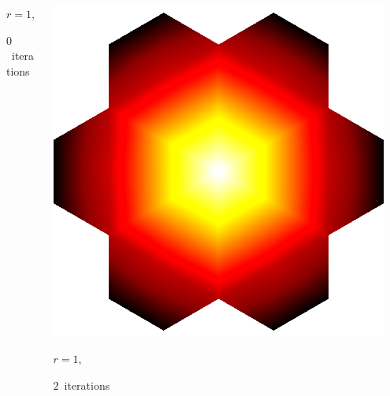 \documentclass[aspectratio=169,t]{beamer}
\begin{document}
{\begin{columns}
\begin{column}{0.22\textwidth}
			{\footnotesize 
				\par \vspace{-1mm} $r=1$, 
				\par \vspace{-1mm} $0$~iterations
			}
		\end{column}
		\begin{column}{0.22\textwidth}
			\centering
			\includegraphics[width=.85\textwidth]{data/synthetic_meshes/hexagonal_tessellation_Dirac_delta_1_v31_f42_funcvals_2iter_crop.png}
			{\footnotesize 
				\par \vspace{-1mm} $r=1$, 
				\par \vspace{-1mm} $2$~iterations
			}
		\end{column}
		\begin{column}{0.17\textwidth}~\end{column}
	\end{columns}
	\vspace*{4mm}
	\begin{columns}
		\begin{column}{0.17\textwidth}~\end{column}
		\begin{column}{0.22\textwidth}
			\centering

\end{column}
\end{columns}}
\end{document}
